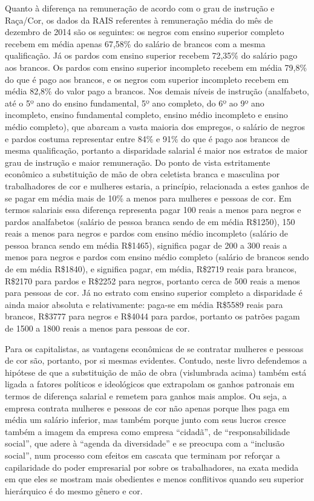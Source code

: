 Quanto à diferença na remuneração de acordo com o grau de instrução e
Raça/Cor, os dados da RAIS referentes à remuneração média do mês de
dezembro de 2014 são os seguintes: os negros com ensino superior
completo recebem em média apenas 67,58\% do salário de brancos com a
mesma qualificação. Já os pardos com ensino superior recebem 72,35\% do
salário pago aos brancos. Os pardos com ensino superior incompleto
recebem em média 79,8\% do que é pago aos brancos, e os negros com
superior incompleto recebem em média 82,8\% do valor pago a brancos. Nos
demais níveis de instrução (analfabeto, até o 5º ano do ensino
fundamental, 5º ano completo, do 6º ao 9º ano incompleto, ensino
fundamental completo, ensino médio incompleto e ensino médio completo),
que abarcam a vasta maioria dos empregos, o salário de negros e pardos
costuma representar entre 84\% e 91\% do que é pago aos brancos de mesma
qualificação, portanto a disparidade salarial é maior nos estratos de
maior grau de instrução e maior remuneração. Do ponto de vista
estritamente econômico a substituição de mão de obra celetista branca e
masculina por trabalhadores de cor e mulheres estaria, a princípio,
relacionada a estes ganhos de se pagar em média mais de 10\% a menos
para mulheres e pessoas de cor. Em termos salariais essa diferença
representa pagar 100 reais a menos para negros e pardos analfabetos
(salário de pessoa branca sendo de em média R\$1250), 150 reais a menos
para negros e pardos com ensino médio incompleto (salário de pessoa
branca sendo em média R\$1465), significa pagar de 200 a 300 reais a
menos para negros e pardos com ensino médio completo (salário de brancos
sendo de em média R\$1840), e significa pagar, em média, R\$2719 reais
para brancos, R\$2170 para pardos e R\$2252 para negros, portanto cerca
de 500 reais a menos para pessoas de cor. Já no estrato com ensino
superior completo a disparidade é ainda maior absoluta e relativamente:
paga-se em média R\$5589 reais para brancos, R\$3777 para negros e
R\$4044 para pardos, portanto os patrões pagam de 1500 a 1800 reais a
menos para pessoas de cor.

Para os capitalistas, as vantagens econômicas de se contratar mulheres e
pessoas de cor são, portanto, por si mesmas evidentes. Contudo, neste
livro defendemos a hipótese de que a substituição de mão de obra
(vislumbrada acima) também está ligada a fatores políticos e ideológicos
que extrapolam os ganhos patronais em termos de diferença salarial e
remetem para ganhos mais amplos. Ou seja, a empresa contrata mulheres e
pessoas de cor não apenas porque lhes paga em média um salário inferior,
mas também porque junto com seus lucros cresce também a imagem da
empresa como empresa ``cidadã'', de ``responsabilidade social'', que
adere à ``agenda da diversidade'' e se preocupa com a ``inclusão
social'', num processo com efeitos em cascata que terminam por reforçar
a capilaridade do poder empresarial por sobre os trabalhadores, na exata
medida em que eles se mostram mais obedientes e menos conflitivos quando
seu superior hierárquico é do mesmo gênero e cor.

